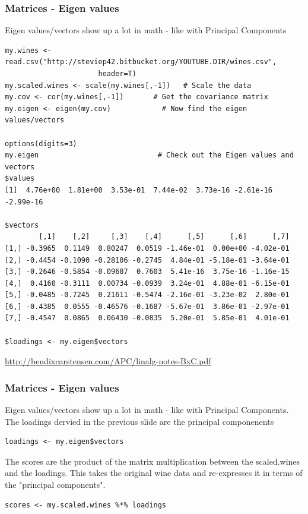 \documentclass{beamer}
\begin{document}
\begin{frame}[fragile]
\frametitle{Matrices - Eigen values}
Eigen values/vectors show up a lot in math - like with Principal Components
\scriptsize
\begin{verbatim}
my.wines <- read.csv("http://steviep42.bitbucket.org/YOUTUBE.DIR/wines.csv",
                      header=T)
my.scaled.wines <- scale(my.wines[,-1])   # Scale the data
my.cov <- cor(my.wines[,-1])       # Get the covariance matrix
my.eigen <- eigen(my.cov)            # Now find the eigen values/vectors

options(digits=3)                 
my.eigen                            # Check out the Eigen values and vectors
$values
[1]  4.76e+00  1.81e+00  3.53e-01  7.44e-02  3.73e-16 -2.61e-16 -2.99e-16

$vectors
        [,1]    [,2]     [,3]    [,4]      [,5]      [,6]      [,7]
[1,] -0.3965  0.1149  0.80247  0.0519 -1.46e-01  0.00e+00 -4.02e-01
[2,] -0.4454 -0.1090 -0.28106 -0.2745  4.84e-01 -5.18e-01 -3.64e-01
[3,] -0.2646 -0.5854 -0.09607  0.7603  5.41e-16  3.75e-16 -1.16e-15
[4,]  0.4160 -0.3111  0.00734 -0.0939  3.24e-01  4.88e-01 -6.15e-01
[5,] -0.0485 -0.7245  0.21611 -0.5474 -2.16e-01 -3.23e-02  2.80e-01
[6,] -0.4385  0.0555 -0.46576 -0.1687 -5.67e-01  3.86e-01 -2.97e-01
[7,] -0.4547  0.0865  0.06430 -0.0835  5.20e-01  5.85e-01  4.01e-01

$loadings <- my.eigen$vectors
\end{verbatim}
\scriptsize
\url{http://bendixcarstensen.com/APC/linalg-notes-BxC.pdf}
\end{frame}

%

\begin{frame}[fragile]
\frametitle{Matrices - Eigen values}
Eigen values/vectors show up a lot in math - like with Principal Components. The loadings dervied in the previous slide are the principal componenents
\newline

\begin{verbatim}
loadings <- my.eigen$vectors
\end{verbatim}
\normalsize
The scores are the product of the matrix multiplication between the scaled.wines and the loadings. This takes the original wine data and re-expresses it in terms of the "principal components".  
\begin{verbatim}
scores <- my.scaled.wines %*% loadings 
\end{verbatim}

\end{frame}
\end{document}
